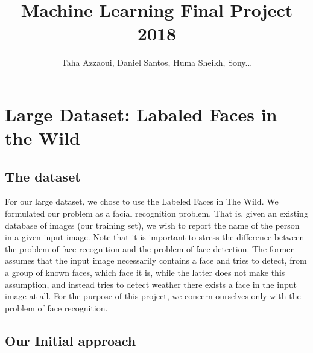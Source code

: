 \documentclass[letterpaper, 11pt, conference]{ieeeconf}
\title{\LARGE \bf Machine Learning Final Project 2018}
\author{Taha Azzaoui, Daniel Santos, Huma Sheikh, Sony...}
\begin{document}
\maketitle
\thispagestyle{empty}
\pagestyle{empty}


\section{Large Dataset: Labaled Faces in the Wild}

\subsection{The dataset}

For our large dataset, we chose to use the Labeled Faces in The Wild. We
formulated our problem as a facial recognition problem. That is, given an
existing database of images (our training set), we wish to report the name of
the person in a given input image. Note that it is important to stress the
difference between the problem of face recognition and the problem of face
detection. The former assumes that the input image necessarily contains a face
and tries to detect, from a group of known faces, which face it is, while the
latter does not make this assumption, and instead tries to detect weather
there exists a face in the input image at all. For the purpose of this project,
we concern ourselves only with the problem of face recognition.


\subsection{Our Initial approach}
\end{document}
